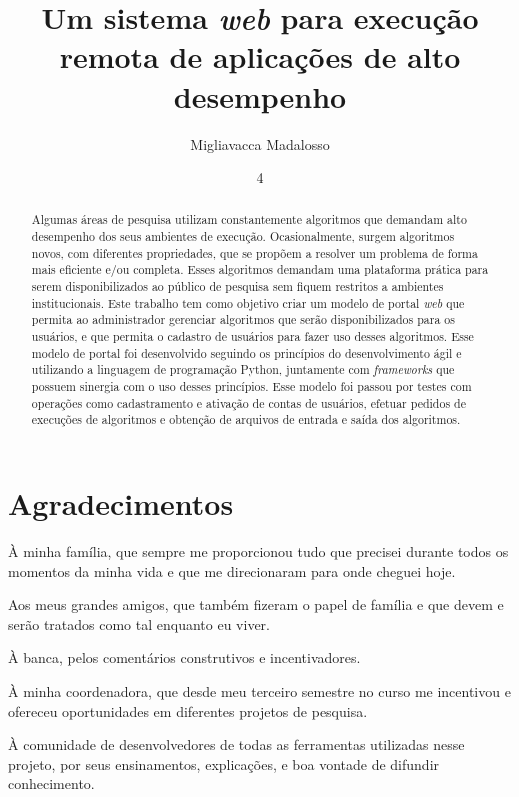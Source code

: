 \documentclass[tg]{mdtufsm}
\title{Um sistema \emph{ web } para execução remota de aplicações de alto desempenho}
\author{Migliavacca Madalosso}{Otávio}
\institute{Centro de Tecnologia}
\date{4}{Dezembro}{2015}
\begin{document}
\maketitle


\chapter*{Agradecimentos}
À minha família, que sempre me proporcionou tudo que precisei durante todos os momentos da minha vida e que me direcionaram para onde cheguei hoje.

Aos meus grandes amigos, que também fizeram o papel de família e que devem e serão tratados como tal enquanto eu viver.

À banca, pelos comentários construtivos e incentivadores.

À minha coordenadora, que desde meu terceiro semestre no curso me incentivou e ofereceu oportunidades em diferentes projetos de pesquisa.

À comunidade de desenvolvedores de todas as ferramentas utilizadas nesse projeto, por seus ensinamentos, explicações, e boa vontade de difundir conhecimento.

\begin{abstract}
Algumas áreas de pesquisa utilizam constantemente algoritmos que demandam alto desempenho dos seus ambientes de execução. Ocasionalmente, surgem algoritmos novos, com diferentes propriedades, que se propõem a resolver um problema de forma mais eficiente e/ou completa. Esses algoritmos demandam uma plataforma prática para serem disponibilizados ao público de pesquisa sem fiquem restritos a ambientes institucionais. Este trabalho tem como objetivo criar um modelo de portal \emph{web} que permita ao administrador gerenciar algoritmos que serão disponibilizados para os usuários, e que permita o cadastro de usuários para fazer uso desses algoritmos. Esse modelo de portal foi desenvolvido seguindo os princípios do desenvolvimento ágil e utilizando a linguagem de programação Python, juntamente com \emph{frameworks} que possuem sinergia com o uso desses princípios. Esse modelo foi passou por testes  com operações como cadastramento e ativação de contas de usuários, efetuar pedidos de execuções de algoritmos e obtenção de arquivos de entrada e saída dos algoritmos.
\end{abstract}
\end{document}
